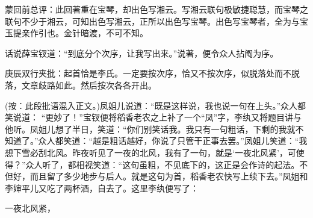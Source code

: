 \begin{parag}
    \begin{note}蒙回前总评：此回著重在宝琴，却出色写湘云。写湘云联句极敏捷聪慧，而宝琴之联句不少于湘云，可知出色写湘云，正所以出色写宝琴。出色写宝琴者，全为与宝玉提亲作引也。金针暗渡，不可不知。\end{note}
\end{parag}


\begin{parag}
    话说薛宝钗道：“到底分个次序，让我写出来。”说著，便令众人拈阄为序。\begin{note}庚辰双行夹批：起首恰是李氏。一定要按次序，恰又不按次序，似脱落处而不脱落，文章歧路如此。然后按次各各开出。\end{note}(按：此段批语混入正文。)凤姐儿说道：“既是这样说，我也说一句在上头。”众人都笑说道： “更妙了！”宝钗便将稻香老农之上补了一个“凤”字，李纨又将题目讲与他听。凤姐儿想了半日，笑道：“你们别笑话我。我只有一句粗话，下剩的我就不知道了。”众人都笑道：“越是粗话越好，你说了只管干正事去罢。”凤姐儿笑道：“我想下雪必刮北风。昨夜听见了一夜的北风，我有了一句，就是‘一夜北风紧’，可使得？”众人听了，都相视笑道：“这句虽粗，不见底下的，这正是会作诗的起法。不但好，而且留了多少地步与后人。就是这句为首，稻香老农快写上续下去。”凤姐和李婶平儿又吃了两杯酒，自去了。这里李纨便写了：
\end{parag}
\begin{poem}
    \begin{pl} 一夜北风紧，\end{pl}
\end{poem}

